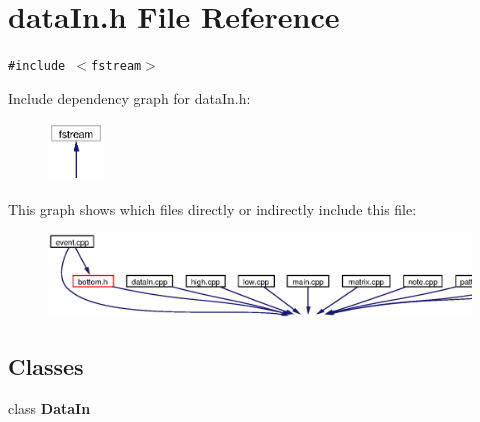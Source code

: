 \section{data\-In.h File Reference}
\label{dataIn_8h}
{\tt \#include $<$fstream$>$}\par


Include dependency graph for data\-In.h:\begin{figure}[H]
\begin{center}
\leavevmode
\includegraphics[width=42pt]{dataIn_8h__incl}
\end{center}
\end{figure}


This graph shows which files directly or indirectly include this file:\begin{figure}[H]
\begin{center}
\leavevmode
\includegraphics[width=388pt]{dataIn_8h__dep__incl}
\end{center}
\end{figure}
\subsection*{Classes}
\begin{CompactItemize}
\item 
class {\bf Data\-In}
\end{CompactItemize}
